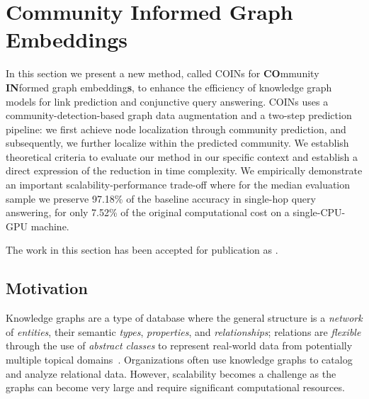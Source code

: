 \section{Community Informed Graph Embeddings}
\label{sec: coins}


In this section we present a new method, called COINs for \textbf{CO}mmunity \textbf{IN}formed graph embedding\textbf{s}, to enhance the efficiency of knowledge graph models for link prediction and conjunctive query answering. COINs uses a community-detection-based graph data augmentation and a two-step prediction pipeline: we first achieve node localization through community prediction, and subsequently, we further localize within the predicted community. We establish theoretical criteria to evaluate our method in our specific context and establish a direct expression of the reduction in time complexity. We empirically demonstrate an important scalability-performance trade-off where for the median evaluation sample we preserve 97.18\% of the baseline accuracy in single-hop query answering, for only 7.52\% of the original computational cost on a single-CPU-GPU machine. 

The work in this section has been accepted for publication as \cite{janchevski_coins_2025}.

\subsection{Motivation}
Knowledge graphs are a type of database where the general structure is a \emph{network} of \emph{entities}, their semantic \emph{types}, \emph{properties}, and \emph{relationships}; relations are \emph{flexible} through the use of \emph{abstract classes} to represent real-world data from potentially multiple topical domains~\cite{ehrlinger_towards_2016,hogan_knowledge_2020}. Organizations often use knowledge graphs to catalog and analyze relational data. However, scalability becomes a challenge as the graphs can become very large and require significant computational resources. %

